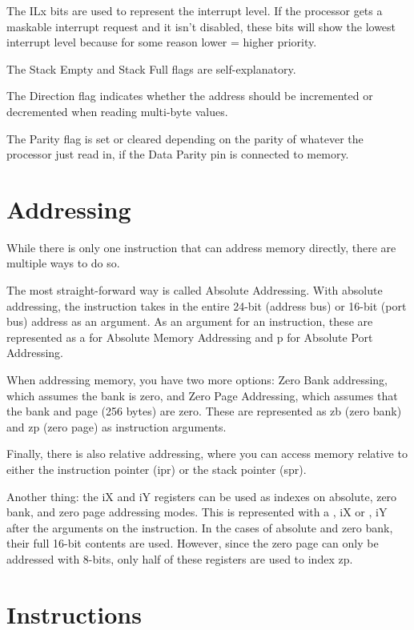 \documentclass[letterpaper,12pt]{book}
\begin{document}
The ILx bits are used to represent the interrupt level. If the processor gets a maskable interrupt request and it isn't disabled, these bits will show the lowest interrupt level because for some reason lower = higher priority.

The Stack Empty and Stack Full flags are self-explanatory.

The Direction flag indicates whether the address should be incremented or decremented when reading multi-byte values.

The Parity flag is set or cleared depending on the parity of whatever the processor just read in, if the Data Parity pin is connected to memory.

\chapter{Addressing}

While there is only one instruction that can address memory directly, there are multiple ways to do so.

The most straight-forward way is called Absolute Addressing. With absolute addressing, the instruction takes in the entire 24-bit (address bus) or 16-bit (port bus) address as an argument. As an argument for an instruction, these are represented as a for Absolute Memory Addressing and p for Absolute Port Addressing.

When addressing memory, you have two more options: Zero Bank addressing, which assumes the bank is zero, and Zero Page Addressing, which assumes that the bank and page (256 bytes) are zero. These are represented as zb (zero bank) and zp (zero page) as instruction arguments.

Finally, there is also relative addressing, where you can access memory relative to either the instruction pointer (ipr) or the stack pointer (spr).

Another thing: the iX and iY registers can be used as indexes on absolute, zero bank, and zero page addressing modes. This is represented with a , iX or , iY after the arguments on the instruction. In the cases of absolute and zero bank, their full 16-bit contents are used. However, since the zero page can only be addressed with 8-bits, only half of these registers are used to index zp.

\chapter{Instructions}
\end{document}
